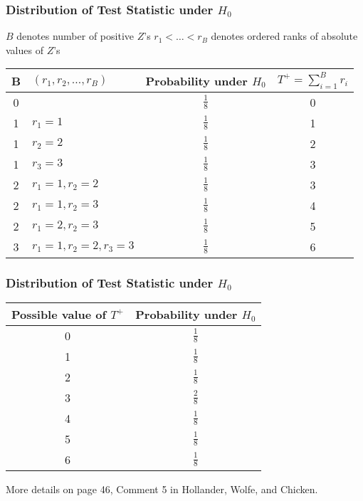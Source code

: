 \documentclass[10pt]{beamer}
\begin{document}
\begin{frame}
\frametitle{Distribution of Test Statistic under $H_0$}

$B$ denotes number of positive $Z$'s \newline
$r_1 < \dots < r_B$ denotes ordered ranks of absolute values of $Z$'s \newline

\centering
\renewcommand{\arraystretch}{1.5}
\small
\begin{tabular}{c|l|c|c}
B & $(r_1,r_2,\dots,r_B)$ & Probability under $H_0$ & $T^+ = \sum_{i=1}^B r_i$\\
\hline
0	&	&	$\frac{1}{8}$	&	0 \\
1	&	$r_1 = 1$		&	$\frac{1}{8}$	&	1 \\
1	&	$r_2 = 2$		&	$\frac{1}{8}$	&	2 \\
1	&	$r_3 = 3$		&	$\frac{1}{8}$	&	3 \\
2	&	$r_1 = 1,r_2 = 2$		&	$\frac{1}{8}$	&	3 \\
2	&	$r_1 = 1,r_2 = 3$		&	$\frac{1}{8}$	&	4 \\
2	&	$r_1 = 2,r_2 = 3$		&	$\frac{1}{8}$	&	5 \\
3	&	$r_1 = 1,r_2 = 2,r_3 = 3$		&	$\frac{1}{8}$	&	6 \\
\end{tabular}

\end{frame}

\begin{frame}
\frametitle{Distribution of Test Statistic under $H_0$}

\centering
\renewcommand{\arraystretch}{1.5}
\small
\begin{tabular}{c|c}
Possible value of $T^+$ & Probability under $H_0$ \\
\hline
0	&	$\frac{1}{8}$ \\
1	&	$\frac{1}{8}$ \\
2	&	$\frac{1}{8}$ \\
3	&	$\frac{2}{8}$ \\
4	&	$\frac{1}{8}$ \\
5	&	$\frac{1}{8}$ \\
6	&	$\frac{1}{8}$ \\
\end{tabular}

\vspace{1cm}
More details on page 46, Comment 5 in Hollander, Wolfe, and Chicken.

\end{frame}
\end{document}
